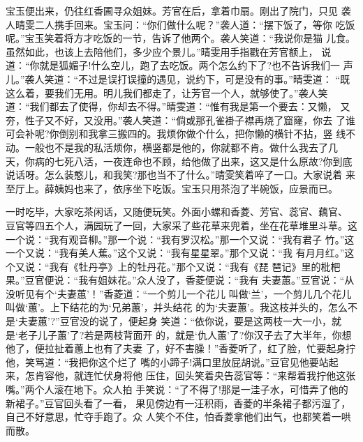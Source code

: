 宝玉便出来，仍往红香圃寻众姐妹。芳官在后，拿着巾扇。刚出了院门，只见
袭人晴雯二人携手回来。宝玉问：“你们做什么呢？”袭人道：“摆下饭了，等你
吃饭呢。”宝玉笑着将方才吃饭的一节，告诉了他两个。袭人笑道：“我说你是猫
儿食。虽然如此，也该上去陪他们，多少应个景儿。”晴雯用手指戳在芳官额上，
说道：“你就是狐媚子!什么空儿，跑了去吃饭。两个怎么约下了?也不告诉我们一
声儿。”袭人笑道：“不过是误打误撞的遇见，说约下，可是没有的事。”晴雯道：
“既这么着，要我们无用。明儿我们都走了，让芳官一个人，就够使了。”袭人笑
道：“我们都去了使得，你却去不得。”晴雯道：“惟有我是第一个要去：又懒，
又夯，性子又不好，又没用。”袭人笑道：“倘或那孔雀褂子襟再烧了窟窿，你去
了谁可会补呢?你倒别和我拿三搬四的。我烦你做个什么，把你懒的横针不拈，竖
线不动。一般也不是我的私活烦你，横竖都是他的，你就都不肯。做什么我去了几
天，你病的七死八活，一夜连命也不顾，给他做了出来，这又是什么原故?你到底
说话呀。怎么装憨儿，和我笑?那也当不了什么。”晴雯笑着啐了一口。大家说着
来至厅上。薛姨妈也来了，依序坐下吃饭。宝玉只用茶泡了半碗饭，应景而已。

一时吃毕，大家吃茶闲话，又随便玩笑。外面小螺和香菱、芳官、蕊官、藕官、
豆官等四五个人，满园玩了一回，大家采了些花草来兜着，坐在花草堆里斗草。这
一个说：“我有观音柳。”那一个说：“我有罗汉松。”那一个又说：“我有君子
竹。”这一个又说：“我有美人蕉。”这个又说：“我有星星翠。”那个又说：“我
有月月红。”这个又说：“我有《牡丹亭》上的牡丹花。”那个又说：“我有《琵
琶记》里的枇杷果。”豆官便说：“我有姐妹花。”众人没了，香菱便说：“我有
夫妻蕙。”豆官说：“从没听见有个‘夫妻蕙’！”香菱道：“一个剪儿一个花儿
叫做‘兰’，一个剪儿几个花儿叫做‘蕙’。上下结花的为‘兄弟蕙’，并头结花
的为‘夫妻蕙’。我这枝并头的，怎么不是‘夫妻蕙’?”豆官没的说了，便起身
笑道：“依你说，要是这两枝一大一小，就是‘老子儿子蕙’了?若是两枝背面开
的，就是‘仇人蕙’了?你汉子去了大半年，你想他了，便拉扯着蕙上也有了夫妻
了，好不害臊！”香菱听了，红了脸，忙要起身拧他，笑骂道：“我把你这个烂了
嘴的小蹄子!满口里放屁胡说。”豆官见他要站起来，怎肯容他，就连忙伏身将他
压住，回头笑着央告蕊官等：“来帮着我拧他这张嘴。”两个人滚在地下。众人拍
手笑说：“了不得了!那是一洼子水，可惜弄了他的新裙子。”豆官回头看了一看，
果见傍边有一汪积雨，香菱的半条裙子都污湿了，自己不好意思，忙夺手跑了。众
人笑个不住，怕香菱拿他们出气，也都笑着一哄而散。


